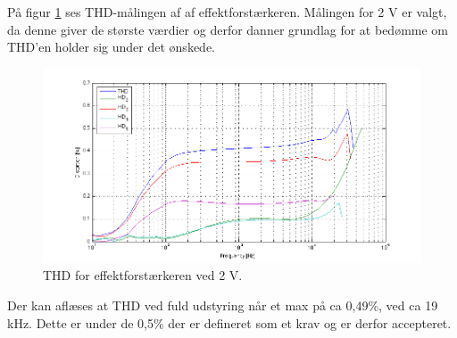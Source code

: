 På figur \ref{fig:acceff:thd2v} ses THD-målingen af af effektforstærkeren. Målingen for 2 V er valgt, da denne giver de største værdier og derfor danner grundlag for at bedømme om THD'en holder sig under det ønskede.
\begin{figure}[h]
\centering
\includegraphics[width=\textwidth]{maalerapporter/effektforstaerker/2V-45mA-uden-modstand thd.png}
\caption{THD for effektforstærkeren ved 2 V.}
\label{fig:acceff:thd2v}
\end{figure}

Der kan aflæses at THD ved fuld udstyring når et max på ca 0,49\%, ved ca 19 kHz. Dette er under de 0,5\% der er defineret som et krav og er derfor accepteret. 